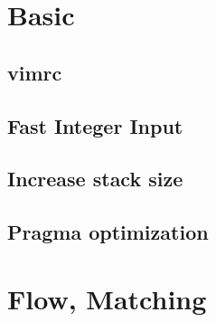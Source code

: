 \documentclass[a4paper,10pt,twocolumn,oneside]{article}
\begin{document}
\pagestyle{fancy}
\fancyfoot{}
\fancyhead[R]{\thepage}
\renewcommand{\headrulewidth}{0.4pt}
\renewcommand{\contentsname}{Contents} 

\scriptsize
\begingroup
\let\clearpage\relax
\tableofcontents
\endgroup
%
\section{Basic}
\subsection{vimrc}

% 
% 
\subsection{Fast Integer Input}

\subsection{Increase stack size}

\subsection{Pragma optimization}

% 
\section{Flow, Matching}
\end{document}
